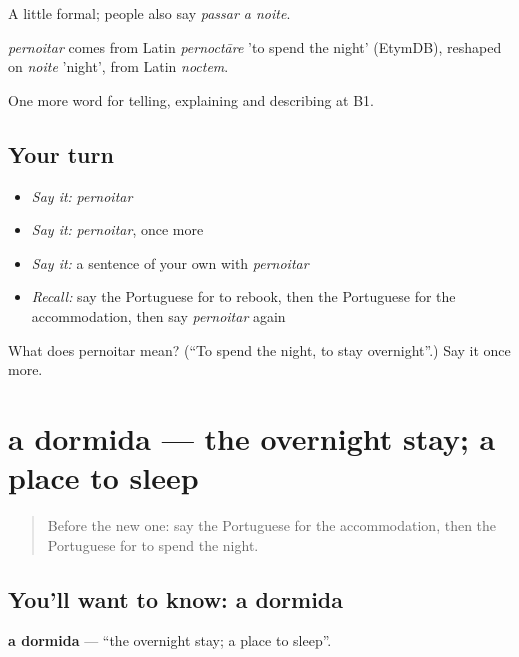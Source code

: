 A little formal; people also say \emph{passar a noite}.

\begin{cousinweb}
\emph{pernoitar} comes from Latin \emph{pernoctāre} 'to spend the night' (EtymDB), reshaped on \emph{noite} 'night', from Latin \emph{noctem}.
\end{cousinweb}

\begin{grammarlens}[title={What you've built}]
One more word for telling, explaining and describing at B1.
\end{grammarlens}

\subsection*{Your turn}
\begin{itemize}
\raggedright
  \item \emph{Say it:} \emph{pernoitar}
  \item \emph{Say it:} \emph{pernoitar}, once more
  \item \emph{Say it:} a sentence of your own with \emph{pernoitar}
  \item \emph{Recall:} say the Portuguese for to rebook, then the Portuguese for the accommodation, then say \emph{pernoitar} again
\end{itemize}

\begin{tcolorbox}[breakable,colback=teal!4,colframe=teal!35!black,title={Before you move on}]
What does pernoitar mean? (\textquotedblleft{}To spend the night, to stay overnight\textquotedblright{}.) Say it once more.
\end{tcolorbox}
\section[a dormida]{a dormida — the overnight stay; a place to sleep}

\label{lesson:PT-C428-dormida}



\begin{quote}
Before the new one: say the Portuguese for the accommodation, then the Portuguese for to spend the night.
\end{quote}

\subsection*{You'll want to know: a dormida}
\textbf{a dormida} — \textquotedblleft{}the overnight stay; a place to sleep\textquotedblright{}.


